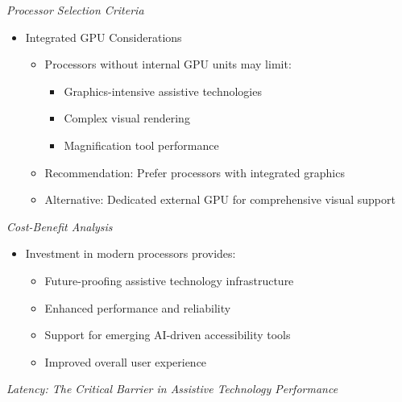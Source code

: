 \emph{Processor Selection Criteria}
\begin{itemize}
    \item Integrated GPU Considerations
        \begin{itemize}
            \item Processors without internal GPU units may limit:
                \begin{itemize}
                    \item Graphics-intensive assistive technologies
                    \item Complex visual rendering
                    \item Magnification tool performance
                \end{itemize}
            \item Recommendation: Prefer processors with integrated graphics
            \item Alternative: Dedicated external GPU for comprehensive visual support
        \end{itemize}
\end{itemize}

\emph{Cost-Benefit Analysis}
\begin{itemize}
    \item Investment in modern processors provides:
        \begin{itemize}
            \item Future-proofing assistive technology infrastructure
            \item Enhanced performance and reliability
            \item Support for emerging AI-driven accessibility tools
            \item Improved overall user experience
        \end{itemize}
\end{itemize}

\emph{Latency: The Critical Barrier in Assistive Technology Performance}

